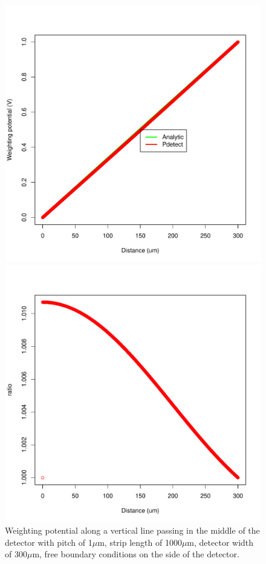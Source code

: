 \documentclass[11pt]{article}
\begin{document}
		\begin{figure}[H]
			\begin{minipage}[b]{.46\linewidth}
				\center
				\includegraphics[scale=0.45]{images/boundary_conditions/parallel.pdf}
				\caption{Weighting potential along a vertical line passing in the middle of the detector with pitch
						of 1$\mu$m, strip length of 1000$\mu$m, detector width of 300$\mu$m, free boundary conditions
						on the side of the detector.}
				\label{fig:parallel}
				\end{minipage} \hfill
				\begin{minipage}[b]{.46\linewidth}
				\center
				\includegraphics[scale=0.45]{images/boundary_conditions/parallel_ratio.pdf}

\end{minipage}
\end{figure}
\end{document}
